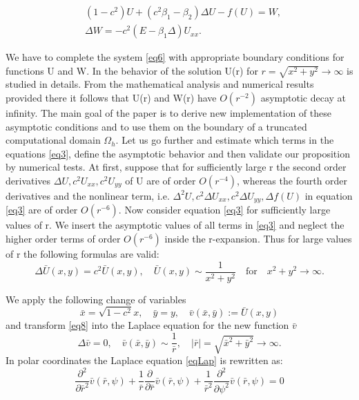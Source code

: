 \documentclass[12pt]{article}
\theoremstyle{theorem}
\theoremstyle{defi}
\begin{document}
\begin{equation}\label{eq6}
\begin{split}
&(1-c^2) U + ( c^2\beta_1 -  \beta_2) \Delta U  - f (U) = W, \\ 
&\Delta W =  -c^2  (E- \beta_1 \Delta) U_{xx}. 
\end{split}
\end{equation}

We have to complete the system \ref{eq6} with appropriate boundary conditions for functions U and W. In \cite{ref6} the behavior of the solution U(r) for  $ r=\sqrt{x^2 + y^2}\rightarrow \infty$ is studied in details. From the mathematical analysis and numerical results provided there it follows that U(r) and W(r) have  $O(r^{-2})$ asymptotic decay at infinity. 
The main goal of the paper is to derive new implementation of these asymptotic conditions and to use them on the boundary of a truncated computational domain $\Omega_h$.
	Let us go further and estimate which terms in the equations \ref{eq3},  define the asymptotic behavior and then validate our proposition by numerical tests. At first, suppose that for sufficiently large r the second order derivatives $\Delta U , c^2U_{xx} , c^2U_{yy}$  of U are of order  $O(r^{-4})$, whereas the fourth order derivatives and the nonlinear term, i.e.  $\Delta^2 U , c^2\Delta U_{xx} , c^2\Delta U_{yy}, \Delta f(U)$    in equation \ref{eq3} are of order $O(r^{-6})$.  
Now consider equation \ref{eq3} for sufficiently large values of r. We insert the asymptotic values of all terms in \ref{eq3} and neglect the higher order terms of order $O(r^{-6})$ inside the r-expansion. Thus for large values of r the following formulas are valid:
\begin{equation}
 \Delta \bar{U}(x,y) =   c^2   \bar{U}(x,y) , \quad  \bar{U}(x,y) \sim \frac{1}{x^2 + y^2} \quad \text{for} \quad x^2 + y^2 \rightarrow \infty  . \label{eq8}
\end{equation}


We apply the following change of variables
\begin{equation}
\bar{x} = \sqrt{1-c^2}x , \quad  \bar{y} = y, \quad \bar{v}( \bar{x}, \bar{y}) := \bar{U} (x, y)\label{eqVC}
\end{equation}
and transform \ref{eq8} into the Laplace equation for the new function $\bar{v}$
\begin{equation} \label{eqLap}
\Delta \bar{v} = 0, \quad \bar{v}( \bar{x}, \bar{y}) \sim \frac{1}{\bar{r}}, \quad |\bar{r}|=\sqrt{\bar{x}^2 + \bar{y}^2} \rightarrow \infty.
\end{equation}
In polar coordinates the Laplace equation \ref{eqLap} is rewritten as:
\begin{equation} \label{eqLapPol}
\frac{\partial^2}{\partial \bar{r}^2} \bar{v}(\bar{r}, \psi) + \frac{1}{\bar{r}} \frac{\partial}{\partial \bar{r}}\bar{v}(\bar{r}, \psi) +  \frac{1}{\bar{r}^2} \frac{\partial^2}{\partial \psi^2} \bar{v}(\bar{r}, \psi) = 0
\end{equation}
\end{document}
